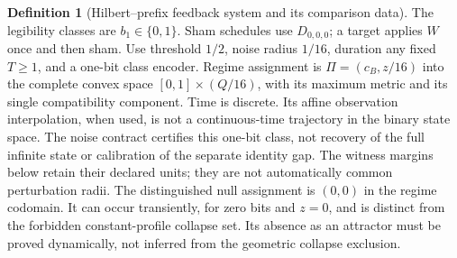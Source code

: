 \documentclass[11pt,a4paper]{article}
\theoremstyle{definition}
\newtheorem{definition}[theorem]{Definition}
\begin{document}
\begin{definition}[Hilbert--prefix feedback system and its comparison data]
The legibility classes are $b_1\in\{0,1\}$. Sham schedules use $D_{0,0,0}$; a target applies $W$ once and then sham. Use threshold $1/2$, noise radius $1/16$, duration any fixed $T\ge1$, and a one-bit class encoder. Regime assignment is $\Pi=(c_B,z/16)$ into the complete convex space $[0,1]\times(Q/16)$, with its maximum metric and its single compatibility component. Time is discrete. Its affine observation interpolation, when used, is not a continuous-time trajectory in the binary state space.
The noise contract certifies this one-bit class, not recovery of the full infinite state or calibration of the separate identity gap. The witness margins below retain their declared units; they are not automatically common perturbation radii.
The distinguished null assignment is $(0,0)$ in the regime codomain. It can occur transiently, for zero bits and $z=0$, and is distinct from the forbidden constant-profile collapse set. Its absence as an attractor must be proved dynamically, not inferred from the geometric collapse exclusion.
\end{definition}
\end{document}
